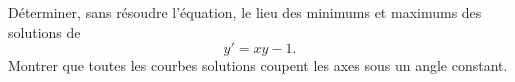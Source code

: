 \begin{exercice}\label{exoEquaDiff0005}

Déterminer, sans résoudre l'équation,  le lieu des minimums et maximums des solutions de
\begin{equation}
	y'=xy-1.
\end{equation}
Montrer que toutes les courbes solutions coupent les axes sous un angle constant.

\end{exercice}
